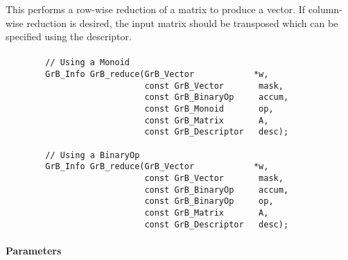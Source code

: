 This performs a row-wise reduction of a matrix to produce a vector.  If column-wise reduction
is desired, the input matrix should be transposed which can be specified using the descriptor.

\paragraph{\syntax}

\begin{verbatim}
        // Using a Monoid
        GrB_Info GrB_reduce(GrB_Vector            *w,
                            const GrB_Vector       mask,
                            const GrB_BinaryOp     accum,
                            const GrB_Monoid       op,  
                            const GrB_Matrix       A,
                            const GrB_Descriptor   desc);
                            
        // Using a BinaryOp
        GrB_Info GrB_reduce(GrB_Vector            *w,
                            const GrB_Vector       mask,
                            const GrB_BinaryOp     accum,
                            const GrB_BinaryOp     op,  
                            const GrB_Matrix       A,
                            const GrB_Descriptor   desc);
\end{verbatim}

\paragraph{Parameters}

